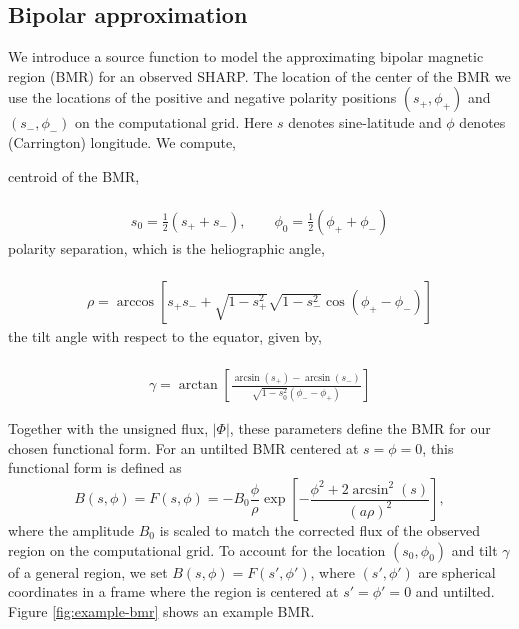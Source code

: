 \subsection{Bipolar approximation}
We introduce a source function to model the approximating bipolar magnetic region (BMR) for an observed SHARP. The location of the center of the BMR we use the locations of the positive and negative polarity positions $(s_+, \phi_+)$ and $(s_-,\phi_-)$ on the computational grid. Here $s$ denotes sine-latitude and $\phi$ denotes (Carrington) longitude. We compute,
\begin{itemize}
    \Item centroid of the BMR,\\ \\ \begin{align}
    s_0 = \frac12(s_+ + s_-),\qquad \phi_0 = \frac12(\phi_+ + \phi_-)
    \label{eqn:center}
    \end {align}
    \Item polarity separation, which is the heliographic angle,\\ \\ \begin{align}
    \rho = \arccos\left[s_+s_- + \sqrt{1-s_+^2}\sqrt{1 - s_-^2}\cos(\phi_+-\phi_-) \right]
    \label{eqn:separation}
    \end {align}
    \Item the tilt angle with respect to the equator, given by,\\ \\ \begin{align}
    \gamma = \arctan\left[\frac{\arcsin(s_+) - \arcsin(s_-)}{\sqrt{1-s_0^2}(\phi_- - \phi_+)}\right]
    \label{eqn:tilt}
    \end {align}
\end{itemize}


Together with the unsigned flux, $|\Phi|$, these parameters define the BMR for our chosen functional form. For an untilted BMR centered at $s=\phi=0$, this functional form is defined as
\begin{equation}
B(s,\phi) = F(s,\phi) = -B_0\frac{\phi}{\rho}\exp\left[-\frac{\phi^2 + 2\arcsin^2(s)}{(a\rho)^2}\right],
\label{eqn:bmr}
\end{equation}
where the amplitude $B_0$ is scaled to match the corrected flux of the observed region on the computational grid. To account for the location $(s_0,\phi_0)$ and tilt $\gamma$ of a general region, we set $B(s,\phi) = F(s',\phi')$, where $(s',\phi')$ are spherical coordinates in a frame where the region is centered at $s'=\phi'=0$ and untilted. Figure \ref{fig:example-bmr} shows an example BMR.

